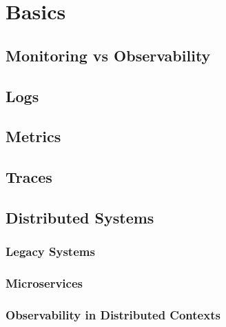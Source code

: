 \chapter{Basics}
\label{chap:basics}

\section{Monitoring vs Observability}
\label{sec:b_monitoring_vs_observability}

\section{Logs}
\label{sec_b_logs}

\section{Metrics}
\label{sec_b_metrics}

\section{Traces}
\label{sec_b_traces}

\section{Distributed Systems}
\label{sec_b_distributed_systems}

\subsection{Legacy Systems}
\subsection{Microservices}
\subsection{Observability in Distributed Contexts}